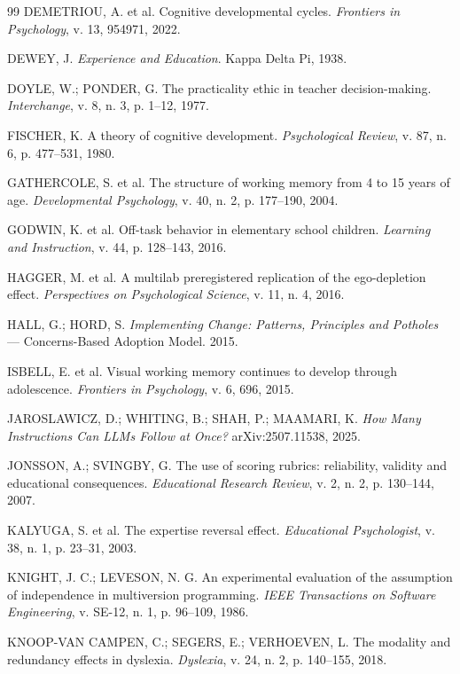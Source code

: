 \documentclass[11pt,a4paper]{article}
\begin{document}
\begin{thebibliography}{99}
DEMETRIOU, A. et al. Cognitive developmental cycles. \textit{Frontiers in Psychology}, v. 13, 954971, 2022.

DEWEY, J. \textit{Experience and Education}. Kappa Delta Pi, 1938.

DOYLE, W.; PONDER, G. The practicality ethic in teacher decision-making. \textit{Interchange}, v. 8, n. 3, p. 1--12, 1977.

FISCHER, K. A theory of cognitive development. \textit{Psychological Review}, v. 87, n. 6, p. 477--531, 1980.

GATHERCOLE, S. et al. The structure of working memory from 4 to 15 years of age. \textit{Developmental Psychology}, v. 40, n. 2, p. 177--190, 2004.

GODWIN, K. et al. Off-task behavior in elementary school children. \textit{Learning and Instruction}, v. 44, p. 128--143, 2016.

HAGGER, M. et al. A multilab preregistered replication of the ego-depletion effect. \textit{Perspectives on Psychological Science}, v. 11, n. 4, 2016.

HALL, G.; HORD, S. \textit{Implementing Change: Patterns, Principles and Potholes} --- Concerns-Based Adoption Model. 2015.

ISBELL, E. et al. Visual working memory continues to develop through adolescence. \textit{Frontiers in Psychology}, v. 6, 696, 2015.

JAROSLAWICZ, D.; WHITING, B.; SHAH, P.; MAAMARI, K. \textit{How Many Instructions Can LLMs Follow at Once?} arXiv:2507.11538, 2025.

JONSSON, A.; SVINGBY, G. The use of scoring rubrics: reliability, validity and educational consequences. \textit{Educational Research Review}, v. 2, n. 2, p. 130--144, 2007.

KALYUGA, S. et al. The expertise reversal effect. \textit{Educational Psychologist}, v. 38, n. 1, p. 23--31, 2003.

KNIGHT, J. C.; LEVESON, N. G. An experimental evaluation of the assumption of independence in multiversion programming. \textit{IEEE Transactions on Software Engineering}, v. SE-12, n. 1, p. 96--109, 1986.

KNOOP-VAN CAMPEN, C.; SEGERS, E.; VERHOEVEN, L. The modality and redundancy effects in dyslexia. \textit{Dyslexia}, v. 24, n. 2, p. 140--155, 2018.


\end{thebibliography}
\end{document}
